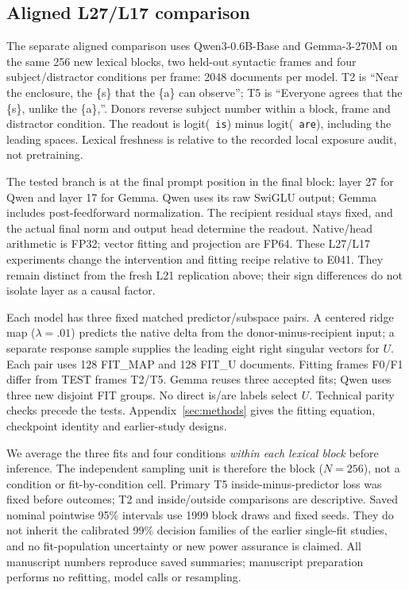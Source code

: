 

\subsection{Aligned L27/L17 comparison}
The separate aligned comparison uses Qwen3-0.6B-Base and Gemma-3-270M on the same 256 new lexical blocks, two held-out syntactic frames and four subject/distractor conditions per frame: 2048 documents per model. T2 is ``Near the enclosure, the \{s\} that the \{a\} can observe''; T5 is ``Everyone agrees that the \{s\}, unlike the \{a\},''. Donors reverse subject number within a block, frame and distractor condition. The readout is logit(\texttt{ is}) minus logit(\texttt{ are}), including the leading spaces. Lexical freshness is relative to the recorded local exposure audit, not pretraining.

The tested branch is at the final prompt position in the final block: layer 27 for Qwen and layer 17 for Gemma. Qwen uses its raw SwiGLU output; Gemma includes post-feedforward normalization. The recipient residual stays fixed, and the actual final norm and output head determine the readout. Native/head arithmetic is FP32; vector fitting and projection are FP64. These L27/L17 experiments change the intervention and fitting recipe relative to E041. They remain distinct from the fresh L21 replication above; their sign differences do not isolate layer as a causal factor.

Each model has three fixed matched predictor/subspace pairs. A centered ridge map ($\lambda=.01$) predicts the native delta from the donor-minus-recipient input; a separate response sample supplies the leading eight right singular vectors for $U$. Each pair uses 128 FIT\_MAP and 128 FIT\_U documents. Fitting frames F0/F1 differ from TEST frames T2/T5. Gemma reuses three accepted fits; Qwen uses three new disjoint FIT groups. No direct is/are labels select $U$. Technical parity checks precede the tests. Appendix~\ref{sec:methods} gives the fitting equation, checkpoint identity and earlier-study designs.

We average the three fits and four conditions \emph{within each lexical block} before inference. The independent sampling unit is therefore the block ($N=256$), not a condition or fit-by-condition cell. Primary T5 inside-minus-predictor loss was fixed before outcomes; T2 and inside/outside comparisons are descriptive. Saved nominal pointwise 95\% intervals use 1999 block draws and fixed seeds. They do not inherit the calibrated 99\% decision families of the earlier single-fit studies, and no fit-population uncertainty or new power assurance is claimed. All manuscript numbers reproduce saved summaries; manuscript preparation performs no refitting, model calls or resampling.
